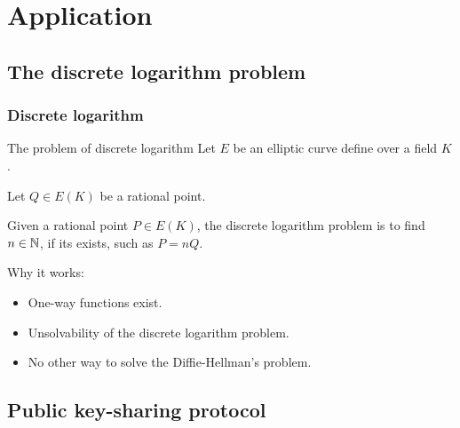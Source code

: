 \section{Application}

\subsection{The discrete logarithm problem} 

\begin{frame}[t]
    \frametitle{Discrete logarithm}
    \begin{alertblock}{The problem of discrete logarithm}
        Let $E$ be an elliptic curve define over a field $K$.

        Let $Q \in E(K)$ be a rational point.

        Given a rational point $P \in E(K)$, the discrete logarithm problem is to find $n \in
        \mathbb{N} $, if its exists, such as $P = nQ$.
    \end{alertblock}

    Why it works:
    \begin{itemize}
        \item One-way functions exist.
        \item Unsolvability of the discrete logarithm problem.
        \item No other way to solve the Diffie-Hellman's problem.
    \end{itemize}
\end{frame}

\subsection{Public key-sharing protocol}

